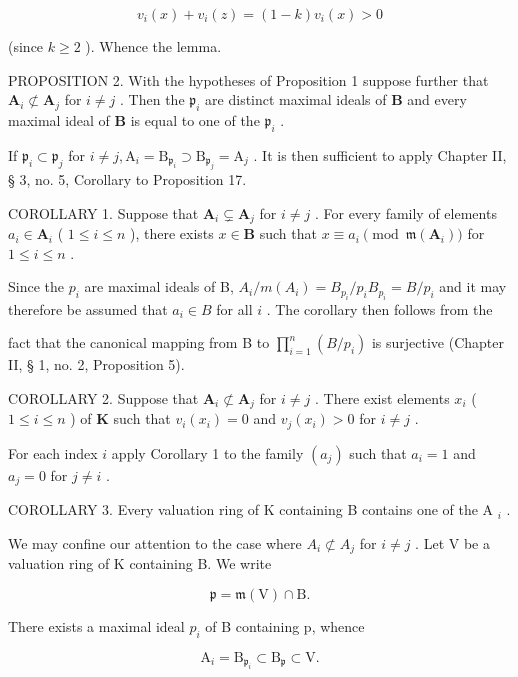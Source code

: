 \[
v _ {i} (x) + v _ {i} (z) = (1 - k) v _ {i} (x) > 0
\]

(since \(k \geqslant 2\) ). Whence the lemma.

PROPOSITION 2. With the hypotheses of Proposition 1 suppose further that \(\mathbf{A}_i \not\subset \mathbf{A}_j\) for \(i \neq j\) . Then the \(\mathfrak{p}_i\) are distinct maximal ideals of \(\mathbf{B}\) and every maximal ideal of \(\mathbf{B}\) is equal to one of the \(\mathfrak{p}_i\) .

If \(\mathfrak{p}_i\subset \mathfrak{p}_j\) for \(i\neq j,\mathrm{A}_i = \mathrm{B}_{\mathfrak{p}_i}\supset \mathrm{B}_{\mathfrak{p}_j} = \mathrm{A}_j\) . It is then sufficient to apply Chapter II, § 3, no. 5, Corollary to Proposition 17.

COROLLARY 1. Suppose that \(\mathbf{A}_i \subsetneq \mathbf{A}_j\) for \(i \neq j\) . For every family of elements \(a_i \in \mathbf{A}_i\) ( \(1 \leqslant i \leqslant n\) ), there exists \(x \in \mathbf{B}\) such that \(x \equiv a_i \pmod{\mathfrak{m}(\mathbf{A}_i)}\) for \(1 \leqslant i \leqslant n\) .

Since the \(p_i\) are maximal ideals of B, \(A_i / m(A_i) = B_{p_i} / p_i B_{p_i} = B / p_i\) and it may therefore be assumed that \(a_i \in B\) for all \(i\) . The corollary then follows from the

fact that the canonical mapping from B to \(\prod_{i=1}^{n} (B/p_i)\) is surjective (Chapter II, § 1, no. 2, Proposition 5).

COROLLARY 2. Suppose that \(\mathbf{A}_i \not\subset \mathbf{A}_j\) for \(i \neq j\) . There exist elements \(x_i\) ( \(1 \leqslant i \leqslant n\) ) of \(\mathbf{K}\) such that \(v_i(x_i) = 0\) and \(v_j(x_i) > 0\) for \(i \neq j\) .

For each index \(i\) apply Corollary 1 to the family \((a_{j})\) such that \(a_{i} = 1\) and \(a_{j} = 0\) for \(j \neq i\) .

COROLLARY 3. Every valuation ring of K containing B contains one of the A \(_{i}\) .

We may confine our attention to the case where \(A_{i} \not\subset A_{j}\) for \(i \neq j\) . Let V be a valuation ring of K containing B. We write

\[
\mathfrak {p} = \mathfrak {m} (\mathrm{V}) \cap \mathrm{B}.
\]

There exists a maximal ideal \(p_{i}\) of B containing p, whence

\[
\mathrm{A} _ {i} = \mathrm{B} _ {\mathfrak {p} _ {i}} \subset \mathrm{B} _ {\mathfrak {p}} \subset \mathrm{V}.
\]

